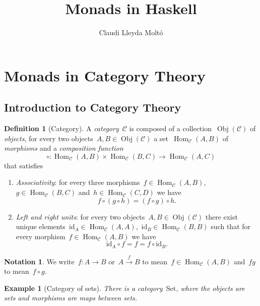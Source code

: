 \documentclass[a4paper]{article}
\title{Monads in Haskell}
\author{Claudi Lleyda Moltó}
\date{}
\theoremstyle{plain}
\newtheorem{example}[theorem]{Example}
\theoremstyle{definition}
\newtheorem{definition}[theorem]{Definition}
\newtheorem{notation}[theorem]{Notation}
\DeclareMathOperator{\Obj}{Obj}
\DeclareMathOperator{\Hom}{Hom}
\newcommand{\id}{\mathrm{id}}
\newcommand{\Set}{\mathrm{Set}}
\newcommand{\cat}[1]{\mathcal{#1}}
\begin{document}
\maketitle
\tableofcontents
\clearpage
\section{Monads in Category Theory}
\subsection{Introduction to Category Theory}

\begin{definition}[Category]
    \label{def:category}
    A \emph{category}~\(\cat{C}\) is composed of a collection~\(\Obj(\cat{C})\)
    of \emph{objects}, for every two objects~\(A,B\in\Obj(\cat{C})\) a
    set~\(\Hom_{\cat{C}}(A,B)\) of \emph{morphisms} and a \emph{composition
    function}
    \[
        \circ:\Hom_{\cat{C}}(A,B)\times\Hom_{\cat{C}}(B,C) \longrightarrow
        \Hom_{\cat{C}}(A,C)
    \]
    that satisfies
    \begin{enumerate}
        \item \emph{Associativity}: for every three
            morphisms~\(f\in\Hom_{\cat{C}}(A,B)\),~\(g\in\Hom_{\cat{C}}(B,C)\)
            and~\(h\in\Hom_{\cat{C}}(C,D)\)
            we have
            \[
                f \circ (g \circ h) = (f \circ g) \circ h.
            \]
        \item \emph{Left and right units}: for every two
            objects~\(A,B\in\Obj(\cat{C})\) there exist unique
            elements~\(\id_{A}\in\Hom_{\cat{C}}(A,A)\),~\(\id_{B}\in\Hom_{\cat{C}}(B,B)\)
            such that for every morphism~\(f\in\Hom_{\cat{C}}(A,B)\) we have
            \[
                \id_{A} \circ f = f = f \circ \id_{B}.
            \]
    \end{enumerate}
\end{definition}

\begin{notation}
    We write~\(f:A\longrightarrow B\) or~\(A\overset{f}{\longrightarrow}B\) to
    mean~\(f\in\Hom_{\cat{C}}(A,B)\) and~\(fg\) to mean~\(f\circ g\).
\end{notation}

\begin{example}[Category of sets]
    \label{cat:set}
    There is a category~\(\Set\), where the objects are sets and morphisms are
    maps between sets.
\end{example}
\end{document}
